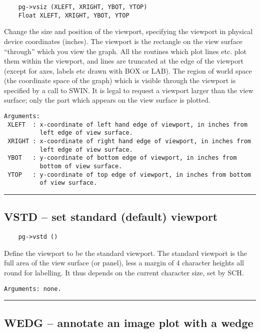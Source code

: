 \begin{verbatim}
    pg->vsiz (XLEFT, XRIGHT, YBOT, YTOP)
    Float XLEFT, XRIGHT, YBOT, YTOP
\end{verbatim}

Change the size and position of the viewport, specifying the viewport
in physical device coordinates (inches).  The viewport is the
rectangle on the view surface ``through'' which you view the graph.
All the routines which plot lines etc. plot them within the viewport,
and lines are truncated at the edge of the viewport (except for axes,
labels etc drawn with BOX or LAB).  The region of world space (the
coordinate space of the graph) which is visible through the viewport
is specified by a call to SWIN.  It is legal to request a viewport
larger than the view surface; only the part which appears on the view
surface is plotted.

\begin{verbatim}
Arguments:
 XLEFT  : x-coordinate of left hand edge of viewport, in inches from
          left edge of view surface. 
 XRIGHT : x-coordinate of right hand edge of viewport, in inches from
          left edge of view surface. 
 YBOT   : y-coordinate of bottom edge of viewport, in inches from
          bottom of view surface. 
 YTOP   : y-coordinate of top edge of viewport, in inches from bottom
          of view surface. 
\end{verbatim}

\hrule

\subsection*{VSTD -- set standard (default) viewport }

\begin{verbatim}
    pg->vstd ()
\end{verbatim}

Define the viewport to be the standard viewport.  The standard
viewport is the full area of the view surface (or panel), less a
margin of 4 character heights all round for labelling.  It thus
depends on the current character size, set by SCH.

\begin{verbatim}
Arguments: none.
\end{verbatim}

\hrule

\subsection*{WEDG -- annotate an image plot with a wedge }

